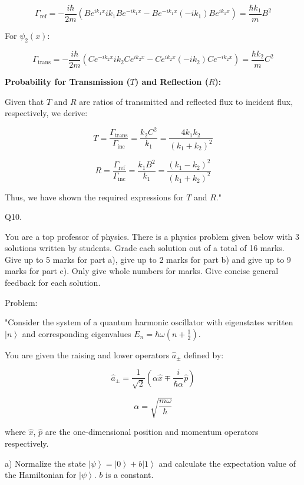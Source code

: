 \[
\Gamma_{\text{ref}} = -\frac{i\hbar}{2m} \left( Be^{ik_1x}ik_1Be^{-ik_1x} - Be^{-ik_1x}(-ik_1)Be^{ik_1x} \right) = \frac{\hbar k_1}{m}B^2
\]

For \(\psi_2(x)\):

\[
\Gamma_{\text{trans}} = -\frac{i\hbar}{2m} \left( Ce^{-ik_2x}ik_2Ce^{ik_2x} - Ce^{ik_2x}(-ik_2)Ce^{-ik_2x} \right) = \frac{\hbar k_2}{m}C^2
\]

\textbf{Probability for Transmission (\(T\)) and Reflection (\(R\)):}

Given that \(T\) and \(R\) are ratios of transmitted and reflected flux to incident flux, respectively, we derive:

\[
T = \frac{\Gamma_{\text{trans}}}{\Gamma_{\text{inc}}} = \frac{k_2C^2}{k_1} = \frac{4k_1k_2}{(k_1+k_2)^2}
\]

\[
R = \frac{\Gamma_{\text{ref}}}{\Gamma_{\text{inc}}} = \frac{k_1B^2}{k_1} = \frac{(k_1-k_2)^2}{(k_1+k_2)^2}
\]

Thus, we have shown the required expressions for \(T\) and \(R\)."



                           Q10. 

You are a top professor of physics. There is a physics problem given below with 3 solutions written by students. Grade each solution out of a total of 16 marks. Give up to 5 marks for part a), give up to 2 marks for part b) and give up to 9 marks for part c). Only give whole numbers for marks. Give concise general feedback for each solution.

Problem:

"Consider the system of a quantum harmonic oscillator with eigenstates written \( \left| n \right> \) and corresponding eigenvalues \( E_{n} = \hbar\omega(n+\frac{1}{2}) \).

You are given the raising and lower operators \( \hat{a}_{\pm} \) defined by:

\[ \hat{a}_{\pm} = \frac{1}{\sqrt{2}}(\alpha \hat{x} \mp \frac{i}{\hbar\alpha} \hat{p}) \]

\[ \alpha = \sqrt{\frac{m\omega}{\hbar}} \]

where \( \hat{x} \), \( \hat{p} \) are the one-dimensional position and momentum operators respectively.

a) Normalize the state \( \left| \psi \right> =  \left| 0 \right> + b \left| 1 \right> \) and calculate the expectation value of the Hamiltonian for \( \left| \psi \right> \). \( b \) is a constant.

